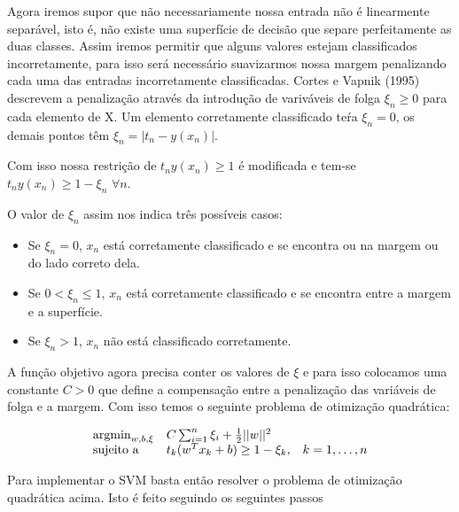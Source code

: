 Agora iremos supor que não necessariamente nossa entrada não é linearmente separável, 
isto é, não existe uma superfície de decisão que separe perfeitamente as duas classes. Assim
iremos permitir que alguns valores estejam classificados incorretamente, para isso
será necessário suavizarmos nossa margem penalizando cada uma das entradas incorretamente
classificadas. Cortes e Vapnik (1995)\cite{cortesVapnik1995} descrevem a penalização
através da introdução de variváveis de folga $\xi_n \ge 0$ para cada elemento de X.
Um elemento corretamente classificado teŕa $\xi_n = 0$, os demais pontos têm
 $\xi_n = |t_n - y(x_n)|$.
 
Com isso nossa restrição de $t_ny(x_n) \ge 1$ é modificada e tem-se 
$t_ny(x_n) \ge 1 - \xi_n$  $\forall n$.

O valor de $\xi_n$ assim nos indica três possíveis casos:

\begin{itemize}
	\item Se $\xi_n = 0$, $x_n$ está corretamente classificado e se encontra
	ou na margem ou do lado correto dela.
	\item Se $0 < \xi_n \le 1$, $x_n$ está corretamente classificado e se encontra
	entre a margem e a superfície.
	\item Se $\xi_n > 1$, $x_n$ não está classificado corretamente.
\end{itemize}

A função objetivo agora precisa conter os valores de $\xi$ e para isso colocamos
uma constante $C > 0$ que define a compensação entre a penalização das variáveis de
folga e a margem. Com isso temos o seguinte problema de otimização quadrática:

\begin{center}
	\begin{equation}
		\begin{array}{ll@{}ll}
			\argmin_{w, b, \xi} & C\sum_{i = 1}^n\xi_i + \frac{1}{2}||w||^2 &\\
			\text{sujeito a}& t_k(w^Tx_k + b) \ge 1 - \xi_k, && k = 1, \ldots, n
		\end{array}
	\end{equation}
\end{center}

Para implementar o SVM basta então resolver o problema de otimização quadrática
acima. Isto é feito seguindo os seguintes passos

